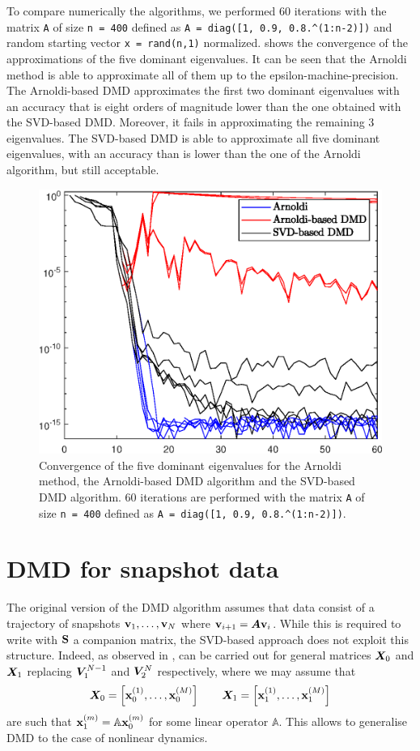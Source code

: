 To compare numerically the algorithms, we performed 60 iterations with the matrix \texttt{A} of size \texttt{n = 400} defined as \texttt{A = diag([1, 0.9, 0.8.\^{}(1:n-2)])} and random starting vector \texttt{x = rand(n,1)} normalized.  shows the convergence of the approximations of the five dominant eigenvalues. It can be seen that the Arnoldi method is able to approximate all of them up to the epsilon-machine-precision. The Arnoldi-based DMD approximates the first two dominant eigenvalues with an accuracy that is eight orders of magnitude lower than the one obtained with the SVD-based DMD. Moreover, it fails in approximating the remaining 3 eigenvalues. The SVD-based DMD is able to approximate all five dominant eigenvalues, with an accuracy than is lower than the one of the Arnoldi algorithm, but still acceptable. 
\begin{figure}[h]
    \centering
    \includegraphics[width=0.5\linewidth]{../code/figures/Arnoldi_vs_DMD.eps}
    \caption{Convergence of the five dominant eigenvalues for the Arnoldi method, the Arnoldi-based DMD algorithm and the SVD-based DMD algorithm. 60 iterations are performed with the matrix \texttt{A} of size \texttt{n = 400} defined as \texttt{A = diag([1, 0.9, 0.8.\^{}(1:n-2)])}.}
    \label{fig_arnoldi_vs_DMD}
\end{figure}

\section{DMD for snapshot data}
\label{section_dmd_koopman}
The original version of the DMD algorithm \cite{schmid_dynamic_2010} assumes that data consist of a trajectory of snapshots $\vb{v}_1, \dots, \vb{v}_N$ where $\vb{v}_{i+1} = \vb*{A}\vb{v}_{i}$. While this is required to write  with $\vb{S}$ a companion matrix, the SVD-based approach does not exploit this structure. Indeed, as observed in \cite{tu_dynamic_2014},  can be carried out for general matrices $\vb*{X}_0$ and $\vb*{X}_1$ replacing $\vb*{V}_1^{N-1}$ and $\vb*{V}_2^{N}$ respectively, where we may assume that
\begin{equation}
    \label{dmd_matrices}
    \vb*{X}_0 = \left[\vb{x}_0^{(1)}, \dots, \vb{x}_0^{(M)}\right] \qquad \vb*{X}_1 = \left[\vb{x}_1^{(1)}, \dots, \vb{x}_1^{(M)}\right]
\end{equation}
are such that $\vb{x}_1^{(m)} = \mathbb{A}\vb{x}_0^{(m)}$ for some linear operator $\mathbb{A}$. This allows to generalise DMD to the case of nonlinear dynamics.

